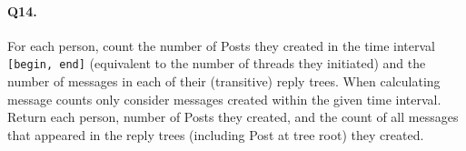 \paragraph{Q14.}
For each person, count the number of Posts they created in the time
interval \texttt{{[}begin,\ end{]}} (equivalent to the number of threads
they initiated) and the number of messages in each of their (transitive)
reply trees. When calculating message counts only consider messages
created within the given time interval.
Return each person, number of Posts they created, and the count of all
messages that appeared in the reply trees (including Post at tree root)
they created.
